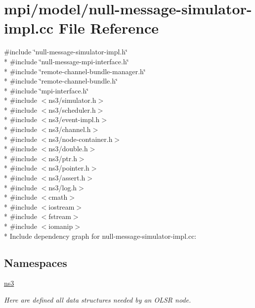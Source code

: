 \hypertarget{null-message-simulator-impl_8cc}{}\section{mpi/model/null-\/message-\/simulator-\/impl.cc File Reference}
\label{null-message-simulator-impl_8cc}
{\ttfamily \#include \char`\"{}null-\/message-\/simulator-\/impl.\+h\char`\"{}}\\*
{\ttfamily \#include \char`\"{}null-\/message-\/mpi-\/interface.\+h\char`\"{}}\\*
{\ttfamily \#include \char`\"{}remote-\/channel-\/bundle-\/manager.\+h\char`\"{}}\\*
{\ttfamily \#include \char`\"{}remote-\/channel-\/bundle.\+h\char`\"{}}\\*
{\ttfamily \#include \char`\"{}mpi-\/interface.\+h\char`\"{}}\\*
{\ttfamily \#include $<$ns3/simulator.\+h$>$}\\*
{\ttfamily \#include $<$ns3/scheduler.\+h$>$}\\*
{\ttfamily \#include $<$ns3/event-\/impl.\+h$>$}\\*
{\ttfamily \#include $<$ns3/channel.\+h$>$}\\*
{\ttfamily \#include $<$ns3/node-\/container.\+h$>$}\\*
{\ttfamily \#include $<$ns3/double.\+h$>$}\\*
{\ttfamily \#include $<$ns3/ptr.\+h$>$}\\*
{\ttfamily \#include $<$ns3/pointer.\+h$>$}\\*
{\ttfamily \#include $<$ns3/assert.\+h$>$}\\*
{\ttfamily \#include $<$ns3/log.\+h$>$}\\*
{\ttfamily \#include $<$cmath$>$}\\*
{\ttfamily \#include $<$iostream$>$}\\*
{\ttfamily \#include $<$fstream$>$}\\*
{\ttfamily \#include $<$iomanip$>$}\\*
Include dependency graph for null-\/message-\/simulator-\/impl.cc\+:
\subsection*{Namespaces}
\begin{DoxyCompactItemize}
\item 
 \hyperlink{namespacens3}{ns3}
\begin{DoxyCompactList}\small\item\em Here are defined all data structures needed by an O\+L\+SR node. \end{DoxyCompactList}\end{DoxyCompactItemize}
